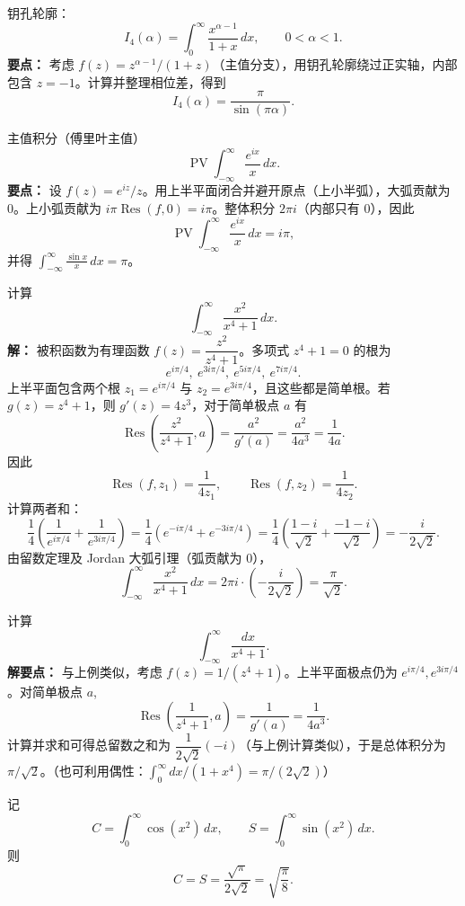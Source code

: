 \documentclass[lang=cn,10pt]{elegantbook}
\begin{document}
	\begin{example}
		钥孔轮廓：
		\[
		I_4(\alpha)=\int_0^\infty\frac{x^{\alpha-1}}{1+x}\,dx,\qquad 0<\alpha<1.
		\]
		\textbf{要点：} 考虑 \(f(z)=z^{\alpha-1}/(1+z)\)（主值分支），用钥孔轮廓绕过正实轴，内部包含 \(z=-1\)。计算并整理相位差，得到
		\[
		I_4(\alpha)=\frac{\pi}{\sin(\pi\alpha)}.
		\]
	\end{example}
	
	\begin{example}
		主值积分（傅里叶主值）
		\[
		\operatorname{PV}\int_{-\infty}^\infty \frac{e^{ix}}{x}\,dx.
		\]
		\textbf{要点：} 设 \(f(z)=e^{iz}/z\)。用上半平面闭合并避开原点（上小半弧），大弧贡献为 \(0\)。上小弧贡献为 \(i\pi\operatorname{Res}(f,0)=i\pi\)。整体积分 \(2\pi i\)（内部只有 \(0\)），因此
		\[
		\operatorname{PV}\int_{-\infty}^\infty \frac{e^{ix}}{x}\,dx = i\pi,
		\]
		并得 \(\int_{-\infty}^\infty \frac{\sin x}{x}\,dx=\pi\)。
	\end{example}
	
	
	\begin{example}
		 计算
		\[
		\int_{-\infty}^{\infty}\frac{x^2}{x^4+1}\,dx.
		\]
		\textbf{解：} 被积函数为有理函数 \(f(z)=\dfrac{z^2}{z^4+1}\)。多项式 \(z^4+1=0\) 的根为
		\[
		e^{i\pi/4},\ e^{3i\pi/4},\ e^{5i\pi/4},\ e^{7i\pi/4}.
		\]
		上半平面包含两个根 \(z_1=e^{i\pi/4}\) 与 \(z_2=e^{3i\pi/4}\)，且这些都是简单根。若 \(g(z)=z^4+1\)，则 \(g'(z)=4z^3\)，对于简单极点 \(a\) 有
		\[
		\operatorname{Res}\!\left(\frac{z^2}{z^4+1},a\right)=\frac{a^2}{g'(a)}=\frac{a^2}{4a^3}=\frac{1}{4a}.
		\]
		因此
		\[
		\operatorname{Res}(f,z_1)=\frac{1}{4z_1},\qquad
		\operatorname{Res}(f,z_2)=\frac{1}{4z_2}.
		\]
		计算两者和：
		\[
		\frac{1}{4}\left(\frac{1}{e^{i\pi/4}}+\frac{1}{e^{3i\pi/4}}\right)
		=\frac{1}{4}\left(e^{-i\pi/4}+e^{-3i\pi/4}\right)
		=\frac{1}{4}\left(\frac{1-i}{\sqrt2}+\frac{-1-i}{\sqrt2}\right)
		=-\frac{i}{2\sqrt2}.
		\]
		由留数定理及 Jordan 大弧引理（弧贡献为 0），
		\[
		\int_{-\infty}^{\infty}\frac{x^2}{x^4+1}\,dx = 2\pi i\cdot\left(-\frac{i}{2\sqrt2}\right)=\frac{\pi}{\sqrt2}.
		\]
	\end{example}
	
	\begin{example}
		 计算
		\[
		\int_{-\infty}^{\infty}\frac{dx}{x^4+1}.
		\]
		\textbf{解要点：} 与上例类似，考虑 \(f(z)=1/(z^4+1)\)。上半平面极点仍为 \(e^{i\pi/4},e^{3i\pi/4}\)。对简单极点 \(a\),
		\[
		\operatorname{Res}\!\left(\frac{1}{z^4+1},a\right)=\frac{1}{g'(a)}=\frac{1}{4a^3}.
		\]
		计算并求和可得总留数之和为 \(\dfrac{1}{2\sqrt2}(-i)\)（与上例计算类似），于是总体积分为 \( \pi/\sqrt2\)。（也可利用偶性：\(\int_0^\infty dx/(1+x^4)=\pi/(2\sqrt2)\)）
	\end{example}
	\begin{example}[Fresnel]
		记
		\[
		C=\int_0^\infty \cos(x^2)\,dx,\qquad S=\int_0^\infty \sin(x^2)\,dx.
		\]
		则
		\[
		C=S=\frac{\sqrt{\pi}}{2\sqrt{2}}=\sqrt{\frac{\pi}{8}}.
		\]
	\end{example}
	
\end{document}

